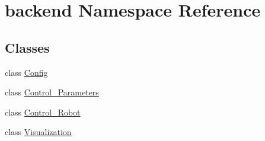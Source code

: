\hypertarget{namespacebackend}{}\section{backend Namespace Reference}
\label{namespacebackend}
\subsection*{Classes}
\begin{DoxyCompactItemize}
\item 
class \hyperlink{classbackend_1_1Config}{Config}
\item 
class \hyperlink{classbackend_1_1Control__Parameters}{Control\+\_\+\+Parameters}
\item 
class \hyperlink{classbackend_1_1Control__Robot}{Control\+\_\+\+Robot}
\item 
class \hyperlink{classbackend_1_1Visualization}{Visualization}
\end{DoxyCompactItemize}
